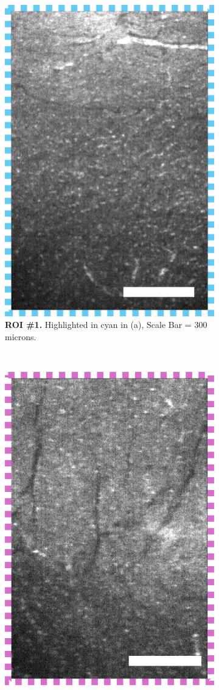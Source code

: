 \begin{figure}[H]
\begin{subfigure}[t]{0.475\textwidth}
\centering
\includegraphics[width=0.75\linewidth]{Images/ROI1.png}
\caption{\textbf{ROI \#1.} Highlighted in cyan in (a), Scale Bar = 300 microns.}
\end{subfigure}
\medskip
~
\begin{subfigure}[t]{0.475\textwidth}
\centering
\includegraphics[width=0.75\linewidth]{Images/ROI2.png}

\end{subfigure}
\end{figure}
